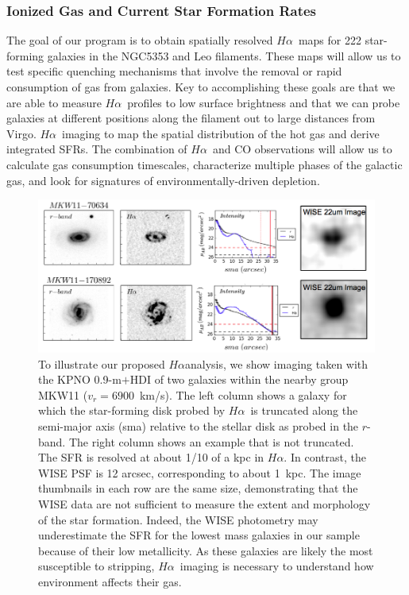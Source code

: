 \documentclass[12pt, preprint]{aastex}
\newcommand{\ha}{$H\alpha$}
\begin{document}
\vspace*{-1cm}
\subsubsection{Ionized Gas and Current Star Formation Rates}
\vspace*{-.3cm}
The goal of our program is to obtain spatially resolved \ha \ maps for 222 star-forming galaxies in
the NGC5353 and Leo filaments. These maps will allow us to test specific quenching
mechanisms that involve the removal or rapid consumption of gas from galaxies. Key to accomplishing
these goals are that we are able to measure \ha \ profiles to low surface brightness and that we can
probe galaxies at different positions along the filament out to large
distances from Virgo.
\ha \ imaging to map the spatial distribution of the hot gas and derive integrated SFRs.  The
combination of \ha \ and CO observations will allow us to calculate
gas consumption timescales, characterize multiple phases of the
galactic gas, and look for signatures of environmentally-driven
depletion.

\begin{figure}[h]
\centering
\includegraphics[width=.85\textwidth]{HalphaProfileWISE.png}
\caption{\small
To illustrate our proposed \ha  analysis, we show
imaging taken with the KPNO 0.9-m$+$HDI of two galaxies within the
nearby group  MKW11 ($v_r = 6900$~km/s). The left column shows a
galaxy for which the star-forming disk probed by \ha \ is truncated
along the semi-major axis (sma)  relative to the stellar disk as
probed in the $r$-band. The right column  shows an example that is not
truncated.  The SFR is resolved  at about 1/10 of a kpc in \ha. In
contrast, the WISE PSF is 12 arcsec, corresponding to about 1~kpc. The image thumbnails in each row are the same size, demonstrating
that the WISE data are not sufficient to measure the extent and
morphology of the star formation.   Indeed, the WISE photometry may
underestimate the SFR for  the lowest mass galaxies in our sample
because of their low metallicity.  As these galaxies are likely the
most susceptible to stripping, \ha\ imaging is necessary to understand
how environment affects their gas.}
\label{fig3}
\end{figure}
\end{document}
